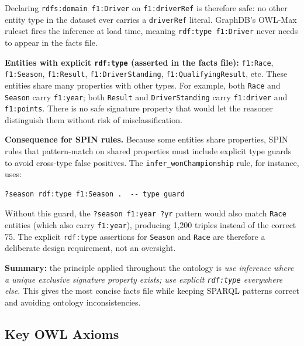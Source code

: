 \documentclass[12pt,a4paper]{article}
\begin{document}
Declaring \texttt{rdfs:domain f1:Driver} on \texttt{f1:driverRef} is therefore safe:
no other entity type in the dataset ever carries a \texttt{driverRef} literal.
GraphDB's OWL-Max ruleset fires the inference at load time, meaning
\texttt{rdf:type f1:Driver} never needs to appear in the facts file.

\textbf{Entities with explicit \texttt{rdf:type} (asserted in the facts file):}
\texttt{f1:Race}, \texttt{f1:Season}, \texttt{f1:Result},
\texttt{f1:DriverStanding}, \texttt{f1:QualifyingResult}, etc.
These entities share many properties with other types.
For example, both \texttt{Race} and \texttt{Season} carry \texttt{f1:year};
both \texttt{Result} and \texttt{DriverStanding} carry \texttt{f1:driver} and
\texttt{f1:points}. There is no safe signature property that would let the reasoner
distinguish them without risk of misclassification.

\textbf{Consequence for SPIN rules.}
Because some entities share properties, SPIN rules that pattern-match on shared
properties must include explicit type guards to avoid cross-type false positives.
The \texttt{infer\_wonChampionship} rule, for instance, uses:

\begin{lstlisting}[style=sparql]
?season rdf:type f1:Season .  -- type guard
\end{lstlisting}

Without this guard, the \texttt{?season f1:year ?yr} pattern would also match
\texttt{Race} entities (which also carry \texttt{f1:year}), producing 1{,}200
triples instead of the correct 75.
The explicit \texttt{rdf:type} assertions for \texttt{Season} and \texttt{Race}
are therefore a deliberate design requirement, not an oversight.

\textbf{Summary:} the principle applied throughout the ontology is \emph{use inference
where a unique exclusive signature property exists; use explicit \texttt{rdf:type}
everywhere else}. This gives the most concise facts file while keeping SPARQL
patterns correct and avoiding ontology inconsistencies.

\subsection{Key OWL Axioms}
\end{document}
